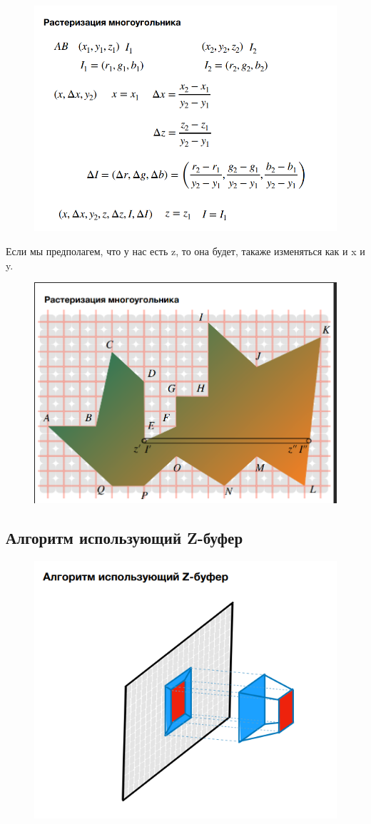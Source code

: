 \documentclass{article}
\begin{document}
\begin{figure} [H]
    \includegraphics[width=0.70\linewidth]{Снимок экрана 2025-05-05 123436.png}
\end{figure}


Если мы предполагем, что у нас есть z, то она будет, такаже изменяться как и x и y.

\begin{figure} [H]
    \includegraphics[width=0.70\linewidth]{Снимок экрана 2025-05-05 123643.png}
\end{figure}


\subsection{Алгоритм использующий Z-буфер}

\begin{figure} [H]
    \includegraphics[width=0.70\linewidth]{Снимок экрана 2025-05-05 125223.png}
\end{figure}
\end{document}
